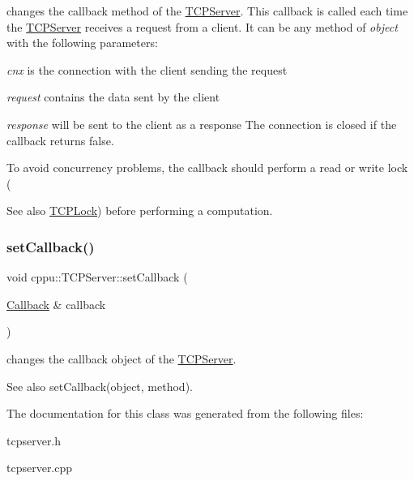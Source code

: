 changes the callback method of the \mbox{\hyperlink{classcppu_1_1_t_c_p_server}{T\+C\+P\+Server}}. This callback is called each time the \mbox{\hyperlink{classcppu_1_1_t_c_p_server}{T\+C\+P\+Server}} receives a request from a client. It can be any method of {\itshape object} with the following parameters\+: 


\begin{DoxyItemize}
\item {\itshape cnx} is the connection with the client sending the request
\item {\itshape request} contains the data sent by the client
\item {\itshape response} will be sent to the client as a response The connection is closed if the callback returns false.
\end{DoxyItemize}

To avoid concurrency problems, the callback should perform a read or write lock (\begin{DoxySeeAlso}{See also}
\mbox{\hyperlink{classcppu_1_1_t_c_p_lock}{T\+C\+P\+Lock}}) before performing a computation. 
\end{DoxySeeAlso}
\mbox{\label{classcppu_1_1_t_c_p_server_a94d3d97b03d5e3e48609e405d8dd7897}} 
\subsubsection{\texorpdfstring{setCallback()}{setCallback()}\hspace{0.1cm}{\footnotesize\ttfamily [2/2]}}
{\footnotesize\ttfamily void cppu\+::\+T\+C\+P\+Server\+::set\+Callback (\begin{DoxyParamCaption}\item[{\mbox{\hyperlink{structcppu_1_1_t_c_p_server_1_1_callback}{Callback}} \&}]{callback }\end{DoxyParamCaption})\hspace{0.3cm}{\ttfamily [inline]}}



changes the callback object of the \mbox{\hyperlink{classcppu_1_1_t_c_p_server}{T\+C\+P\+Server}}. 

\begin{DoxySeeAlso}{See also}
set\+Callback(object, method). 
\end{DoxySeeAlso}


The documentation for this class was generated from the following files\+:\begin{DoxyCompactItemize}
\item 
tcpserver.\+h\item 
tcpserver.\+cpp\end{DoxyCompactItemize}
